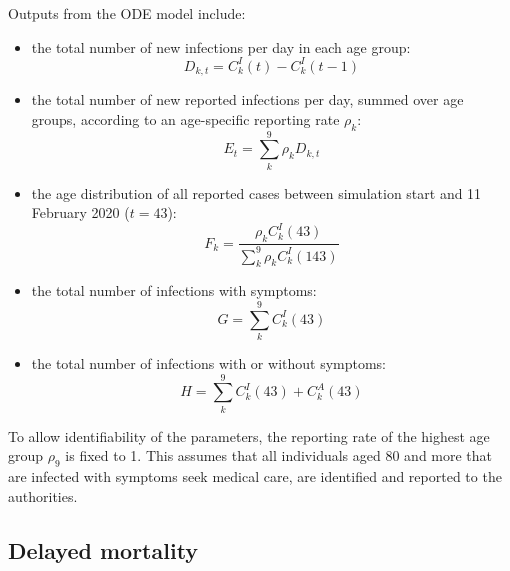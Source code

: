 \documentclass{article}
\begin{document}
Outputs from the ODE model include:
\begin{itemize}
		\item the total number of new infections per day in each age group:
	\begin{equation}
	D_{k,t} =  C^I_k(t) - C^I_k(t-1) 
	\end{equation}
	\item  the total number of new reported infections per day, summed over age groups, according to an age-specific reporting rate $\rho_k$:
\begin{equation}
E_t = \sum_k^9 \rho_k D_{k,t}
\end{equation}	
\item the age distribution of all reported cases between simulation start and 11 February 2020 ($t=43$):
\begin{equation}
F_k =  \frac{\rho_kC^I_k(43)}{\sum_k^9 \rho_k C^I_k(143)}
\end{equation}	
\item the total number of infections with symptoms:
\begin{equation}
G = \sum_k^9 C^I_k(43)
\end{equation}	
\item the total number of infections with or without symptoms:
\begin{equation}
H = \sum_k^9 C^I_k(43) + C^A_k(43)
\end{equation}
\end{itemize}
To allow identifiability of the parameters, the reporting rate of the highest age group $\rho_9$ is fixed to 1. 
This assumes that all individuals aged 80 and more that are infected with symptoms seek medical care, are identified and reported to the authorities. 

\subsection{Delayed mortality}
\end{document}
